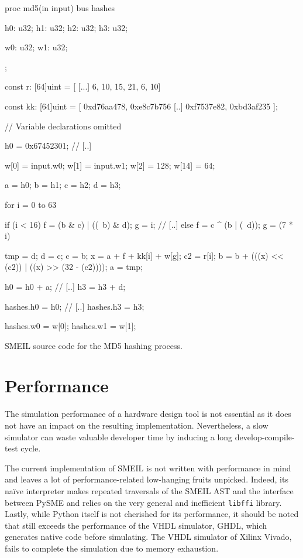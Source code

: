 
\begin{widefigure}

\begin{smeilcode2}
proc md5(in input)
  bus hashes {
    h0: u32;
    h1: u32;
    h2: u32;
    h3: u32;

    w0: u32;
    w1: u32;
  };

  const r: [64]uint = [
    [...]
    6, 10, 15, 21, 6, 10]

  const kk: [64]uint = [
    0xd76aa478, 0xe8c7b756
    [..]
    0xf7537e82, 0xbd3af235
    ];

// Variable declarations omitted

{
  h0 = 0x67452301;
  // [..]

  w[0] = input.w0;
  w[1] = input.w1;
  w[2] = 128;
  w[14] = 64;

  a = h0;
  b = h1;
  c = h2;
  d = h3;

for i = 0 to 63 {
  if (i < 16) {
    f = (b & c) | ((~b) & d);
    g = i;
   // [..]
  } else {
    f = c ^ (b | (~d));
    g = (7 * i) %
  }

  tmp = d;
  d = c;
  c = b;
  x = a + f + kk[i] + w[g];
  c2 = r[i];
  b = b + (((x) << (c2)) |
      ((x) >> (32 - (c2))));
  a = tmp;
}

h0 = h0 + a;
// [..]
h3 = h3 + d;

hashes.h0 = h0;
// [..]
hashes.h3 = h3;

hashes.w0 = w[0];
hashes.w1 = w[1];
}

\end{smeilcode2}
  \caption{SMEIL source code for the MD5 hashing process.}
  \label{fig:smeilhash}

\end{widefigure}

\section{Performance}
\label{sec:perf}
The simulation performance of a hardware design tool is not essential as it does
not have an impact on the resulting implementation. Nevertheless, a slow
simulator can waste valuable developer time by inducing a long
develop-compile-test cycle.

The current implementation of SMEIL is not written with performance in mind and
leaves a lot of performance-related low-hanging fruits unpicked. Indeed, its
naïve interpreter makes repeated traversals of the SMEIL AST and the interface
between PySME and \libsme{} relies on the very general and inefficient
\texttt{libffi} library.
Lastly, while Python itself is not cherished for its performance, it should be
noted that \libsme{} still exceeds the performance of the VHDL simulator, GHDL, 
which generates native code before simulating. The VHDL
simulator of Xilinx Vivado, fails to complete the simulation due to memory
exhaustion.

